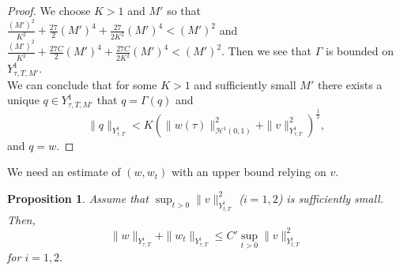 \documentclass[10pt,a4paper,final]{article}
\numberwithin{equation}{section}
\newtheorem{prop}[theorem]{Proposition}
\newcommand{\cH}{\mathcal{H}}
\begin{document}
\begin{proof}
We choose $K>1$ and $M'$ so that  $ \frac{(M')^2}{K^2}+\frac{27}{2}(M')^4+\frac{27}{2K^2}(M')^4<(M')^2$ and $\frac{(M')^2}{K^2}+\frac{27C}{2}(M')^4+\frac{27C}{2K^2}(M')^4<(M')^2$. Then we see that $\Gamma$ is bounded on $Y^1_{\tau,T,M'}$.\\


 We can conclude that for some $K>1$ and sufficiently small $M'$ there exists a unique $q\in Y^{1}_{\tau,T,M'}$ that $q=\Gamma(q)$ and $$\|q\|_{Y^{1}_{\tau,T}}<K(\|w(\tau)\|_{\cH^1(0,1)}^2+\|v\|_{Y^{1}_{\tau,T}}^2)^{\frac12},$$
 and $q=w$. 
\end{proof}

We need an estimate of $(w, w_t)$ with an upper bound relying on $v$.

\begin{prop}\label{Prop4}
Assume that $\sup_{t>0}\|v\|_{Y^{i}_{t,T}}^2$ ($i=1,2$) is sufficiently small. Then, 
$$\|w\|_{Y^{i}_{\tau,T}}+\|w_t\|_{Y^i_{\tau,T}}\leq C'\sup_{t>0}\|v\|_{Y^{i}_{t,T}}^2$$
for $i=1,2$.
\end{prop}
\end{document}
